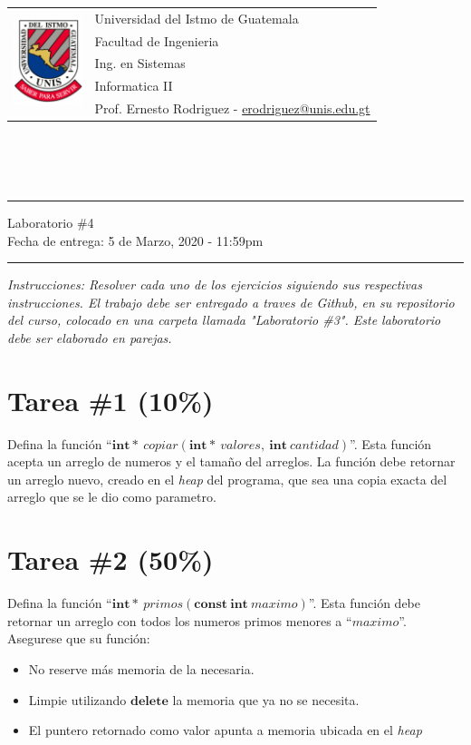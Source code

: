 \documentclass{article}
\newcommand{\horrule}[1]{\rule{\linewidth}{#1}}
\begin{document}
\begin{tabular}{l l}
\multirow{5}{*}{\includegraphics[width=2cm]{../../recursos/logo.png}} & Universidad del Istmo de Guatemala \\
 & Facultad de Ingenieria \\
 & Ing. en Sistemas \\
 & Informatica II \\
 & Prof. Ernesto Rodriguez - \href{mailto:erodriguez@unis.edu.gt}{erodriguez@unis.edu.gt} \\
\end{tabular}
\\\\\\

\begin{center}
        \horrule{0.5pt}
        \huge{Laboratorio \#4} \\
        \large{Fecha de entrega: 5 de Marzo, 2020 - 11:59pm} \\
        \horrule{1pt}
\end{center}

\emph{Instrucciones: Resolver cada uno de los ejercicios siguiendo sus respectivas
instrucciones. El trabajo debe ser entregado a traves de Github, en su repositorio del curso, colocado en una carpeta llamada "Laboratorio \#3".
Este laboratorio debe ser elaborado en parejas.}

\section*{Tarea \#1 (10\%)}
Defina la funci\'on ``$\mathbf{int*}\ copiar(\mathbf{int*}\ valores,\ \mathbf{int}\ cantidad)$''. Esta funci\'on
acepta un arreglo de numeros y el tama\~no del arreglos. La funci\'on debe retornar un arreglo nuevo, creado
en el \emph{heap} del programa, que sea una copia exacta del arreglo que se le dio como parametro.

\section*{Tarea \#2 (50\%)}

Defina la funci\'on ``$\mathbf{int*}\ primos(\mathbf{const\ int}\ maximo)$''. Esta funci\'on debe retornar un arreglo
con todos los numeros primos menores a ``$maximo$''. Asegurese que su funci\'on:
\begin{itemize}
        \item{No reserve m\'as memoria de la necesaria.}
        \item{Limpie utilizando $\mathbf{delete}$ la memoria que ya no se necesita.}
        \item{El puntero retornado como valor apunta a memoria ubicada en el \emph{heap}}
\end{itemize}
\end{document}
